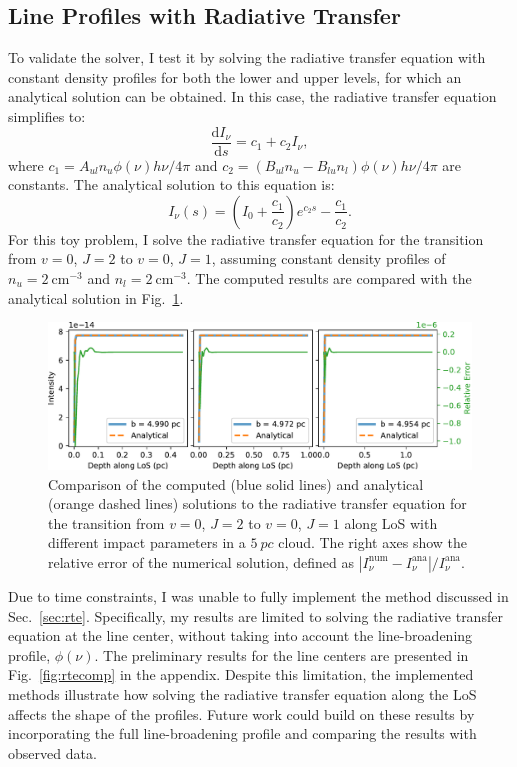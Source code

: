 \documentclass[12pt,a4paper]{article}
\newcommand{\fird}[2][]{\frac{\mathrm{d}#1}{\mathrm{d}#2}}
\begin{document}
\subsection{Line Profiles with Radiative Transfer} \label{sec:comprte}

To validate the solver, I test it by solving the radiative transfer equation with constant density profiles for both the lower and upper levels, for which an analytical solution can be obtained. In this case, the radiative transfer equation simplifies to:
\begin{equation}
    \fird[I_\nu]{s} = c_1  + c_2 I_\nu, \label{eq:simple_rte}
\end{equation} 
where $c_1 = A_{ul} n_u \phi(\nu) h\nu/4\pi$ and $c_2 = (B_{ul} n_u - B_{lu} n_l) \phi(\nu) h\nu/4\pi$ are constants. The analytical solution to this equation is:
\begin{equation}
    I_\nu (s) = (I_0 + \frac{c_1}{c_2})e^{c_2s} - \frac{c_1}{c_2}.
\end{equation}
For this toy problem, I solve the radiative transfer equation for the  transition from  \(v = 0\), \(J = 2\) to \(v = 0\), \(J = 1\), assuming constant density profiles of $n_u = \qty{2}{\cm^{-3}}$ and $n_l = \qty{2}{\cm^{-3}}$. The computed results are compared with the analytical solution in Fig.~\ref{fig:rtecstn}.

\begin{figure}[h]
    \centering
    \includegraphics[width=\textwidth,keepaspectratio]{rte_constant_density.pdf}
    \caption{Comparison of the computed (blue solid lines) and analytical (orange dashed lines) solutions to the radiative transfer equation for the  transition from \(v = 0\), \(J = 2\) to \(v = 0\), \(J = 1\) along LoS with different impact parameters in a \(\qty{5}{pc}\) cloud. The right axes show the relative error of the numerical solution, defined as $|I_\nu^\text{num} - I_\nu^\text{ana}|/I_\nu^\text{ana}$.} \label{fig:rtecstn}
\end{figure}

Due to time constraints, I was unable to fully implement the method discussed in Sec.~\ref{sec:rte}. Specifically, my results are limited to solving the radiative transfer equation at the line center, without taking into account the line-broadening profile, $\phi(\nu)$. The preliminary results for the line centers are presented in Fig.~\ref{fig:rtecomp} in the appendix. Despite this limitation, the implemented methods illustrate how solving the radiative transfer equation along the LoS affects the shape of the profiles. Future work could build on these results by incorporating the full line-broadening profile and comparing the results with observed data.
\end{document}
